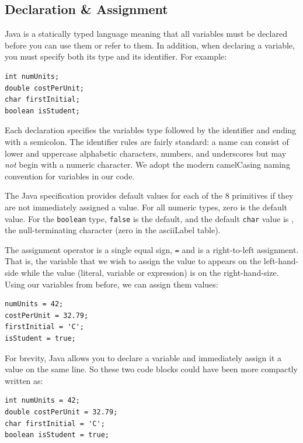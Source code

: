 \subsection{Declaration \& Assignment}

Java is a statically typed language meaning that all variables must be declared
before you can use them or refer to them.  In addition, when declaring a variable, 
you must specify both its type and its identifier.  For example:

\begin{verbatim}
int numUnits;
double costPerUnit;
char firstInitial;
boolean isStudent;
\end{verbatim}

Each declaration specifies the variables type followed by the identifier and ending
with a semicolon.  The identifier rules are fairly standard: a name can consist
of lower and uppercase alphabetic characters, numbers, and underscores but
may \emph{not} begin with a numeric character.  We adopt the modern camelCasing
naming convention for variables in our code.

The Java specification provides default values for each of the 8 primitives if they
are not immediately assigned a value.  For all numeric types, zero is the default value.
For the \texttt{boolean} type, \texttt{false} is the default, and 
the default \texttt{char} value is \texttt{\0}, the null-terminating character
(zero in the \gls{asciiLabel} table).

The assignment operator is a single equal sign, \texttt{=} and is a right-to-left
assignment.  That is, the variable that we wish to assign the value to appears on the
left-hand-side while the value (literal, variable or expression) is on the right-hand-size.
Using our variables from before, we can assign them values:

\begin{verbatim}
numUnits = 42;
costPerUnit = 32.79;
firstInitial = 'C';
isStudent = true;
\end{verbatim}

For brevity, Java allows you to declare a variable and immediately assign 
it a value on the same line.  So these two code blocks could have been 
more compactly written as:

\begin{verbatim}
int numUnits = 42;
double costPerUnit = 32.79;
char firstInitial = 'C';
boolean isStudent = true;
\end{verbatim}

